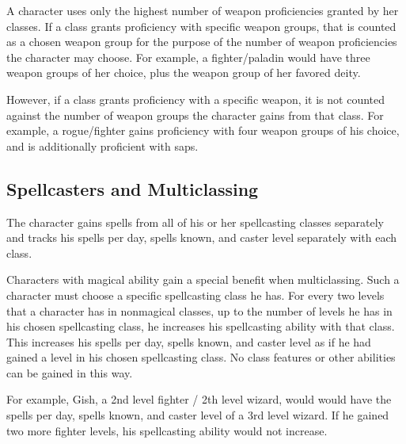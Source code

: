  A character uses only the highest number of weapon proficiencies granted by her classes. If a class grants proficiency with specific weapon groups, that is counted as a chosen weapon group for the purpose of the number of weapon proficiencies the character may choose. For example, a fighter/paladin would have three weapon groups of her choice, plus the weapon group of her favored deity.

However, if a class grants proficiency with a specific weapon, it is not counted against the number of weapon groups the character gains from that class. For example, a rogue/fighter gains proficiency with four weapon groups of his choice, and is additionally proficient with saps.

\subsection{Spellcasters and Multiclassing}\label{Spellcasters and Multiclassing}
The character gains spells from all of his or her spellcasting classes separately and tracks his spells per day, spells known, and caster level separately with each class.

Characters with magical ability gain a special benefit when multiclassing. Such a character must choose a specific spellcasting class he has. For every two levels that a character has in nonmagical classes, up to the number of levels he has in his chosen spellcasting class, he increases his spellcasting ability with that class. This increases his spells per day, spells known, and caster level as if he had gained a level in his chosen spellcasting class. No class features or other abilities can be gained in this way. 

For example, Gish, a 2nd level fighter / 2th level wizard, would would have the spells per day, spells known, and caster level of a 3rd level wizard. If he gained two more fighter levels, his spellcasting ability would not increase.

